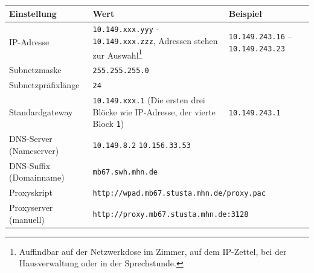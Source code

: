 \documentclass[a4paper,12pt]{scrartcl}
\begin{document}
\begin{center}
  \begin{tabularx}{\linewidth}{|lXp{.2\linewidth}|}
    \hline
    Einstellung & Wert & Beispiel \\
    \hline \hline
    IP-Adresse & \nolinkurl{10.149.xxx.yyy} - \nolinkurl{10.149.xxx.zzz}, \newline 8 Adressen stehen zur Auswahl\footnote{Auffindbar auf der Netzwerkdose im Zimmer, auf dem IP-Zettel, bei der Hausverwaltung oder in der Sprechstunde.} & \nolinkurl{10.149.243.16} – \nolinkurl{10.149.243.23} \\
    \hline
    Subnetzmaske & \nolinkurl{255.255.255.0} & \\
    \hline
    Subnetzpräfixlänge & \nolinkurl{24} & \\
    \hline
    Standardgateway & \nolinkurl{10.149.xxx.1} \newline (Die ersten drei Blöcke wie IP-Adresse, der vierte Block \nolinkurl{1}) & \nolinkurl{10.149.243.1} \\
    \hline
    DNS-Server (Nameserver) & \nolinkurl{10.149.8.2} \newline \nolinkurl{10.156.33.53} & \\
    \hline
    DNS-Suffix (Domainname) & \nolinkurl{mb67.swh.mhn.de} & \\
    \hline
    Proxyskript & \multicolumn{2}{l|}{\nolinkurl{http://wpad.mb67.stusta.mhn.de/proxy.pac}} \\
    \hline
    Proxyserver (manuell) & \multicolumn{2}{l|}{\nolinkurl{http://proxy.mb67.stusta.mhn.de:3128}} \\
    \hline
  \end{tabularx}
\end{center}
\end{document}
